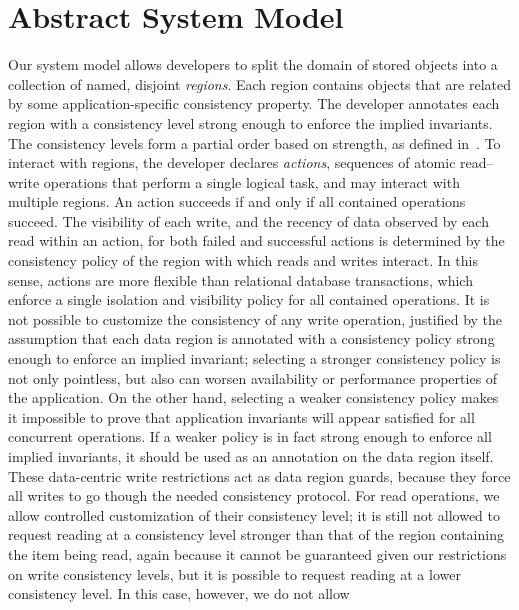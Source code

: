 \documentclass[preprint,numbers]{sigplanconf}
\begin{document}
\section{Abstract System Model}
\label{sec:model}
Our system model allows developers to split the domain of stored objects into a
collection of named, disjoint
\emph{regions}. Each
region contains objects that are related by some application-specific consistency property. The
developer annotates each region with a consistency level 
strong enough to enforce the implied invariants. The consistency levels form
a partial order
based on strength, as defined
in~\cite{sivaramakrishnan2015declarative}.
To interact with regions, the developer
declares \emph{actions}, sequences of atomic
read--write operations that perform a single logical task, and may interact with
multiple regions. An action succeeds if and only if all contained operations
succeed. The visibility of each write, and the recency of
data observed by each read within an action, for both failed and successful
actions is determined by the consistency policy of the region with which reads
and writes interact. In this sense, actions are more flexible than relational
database transactions, which enforce a single isolation and visibility policy for all contained
operations. It is not possible to customize the consistency of any write operation, justified
by the assumption that each data region is annotated with a consistency policy strong enough to enforce 
an implied invariant; selecting a stronger
consistency policy is not only pointless, but also can worsen
availability or performance properties of the application. On the other hand,
selecting a weaker consistency policy makes it impossible to prove that
application invariants will appear satisfied for all concurrent
operations. If a weaker policy is in fact strong enough to enforce all implied
invariants, it should be used as an annotation on the data region itself. 
These data-centric write restrictions act as data region guards, because they force all writes to go
though the needed consistency protocol. For read operations, we allow controlled customization of 
their consistency level; it is still not allowed to request reading
at a consistency level stronger than that of the region containing the item
being read, again because it cannot be guaranteed given our restrictions on
write consistency levels, but it is possible to
request reading at a lower consistency level. In this case, however, we do not allow
\end{document}
